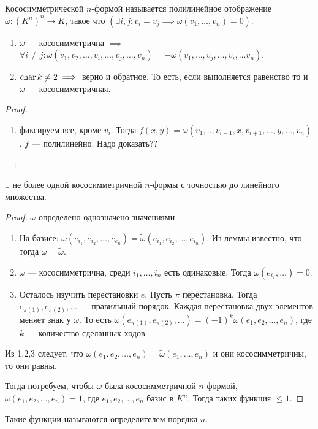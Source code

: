 \begin{definition}
    Кососимметрической $n$-формой называется полилинейное отображение  $\omega\!: (K^n)^n \to K$, такое что  $(\exists i, j\!: v_i = v_j \implies \omega(v_1, \ldots, v_n) = 0)$.
\end{definition}
\begin{statement}
    \begin{enumerate}
        \item $\omega$ --- кососимметрична  $\implies$  $\forall i \neq j\!: \omega(v_1, v_2, \ldots, v_i, \ldots, v_j, \ldots, v_n) = - \omega(v_1,\ldots, v_j, \ldots, v_i, \ldots v_n)$.
        \item $\operatorname{char} k \neq 2 \implies $ верно и обратное. То есть, если выполняется равенство то и  $\omega$ --- кососимметричная. 
    \end{enumerate}
\end{statement}
\begin{proof}
    \begin{enumerate}
        \item фиксируем все, кроме $v_i$. Тогда  $f(x, y) = \omega(v_1, .., v_{i-1}, x, v_{i+1}, \ldots, y, \ldots, v_n)$. $f$ --- полилинейно. Надо доказать?? 
    \end{enumerate}
\end{proof}
\begin{statement}
    $\exists$ не более одной кососимметричной  $n$-формы с точностью до линейного множества. 
\end{statement}
\begin{proof}
    $\omega$ определено однозначено значениями
     \begin{enumerate}
         \item На базисе: $\omega(e_{i_1}, e_{i_2}, \ldots, e_{e_n}) = \widetilde{\omega}(e_{i_1}, e_{i_2}, \ldots, e_{i_n})$. Из леммы известно, что тогда $\omega = \widetilde{\omega}$. 
         \item $\omega$ --- кососимметрична, среди  $i_1, \ldots, i_n$ есть одинаковые. Тогда $\omega(e_{i_1},\ldots) = 0$.
         \item Осталось изучить перестановки $e$. Пусть $\pi$ перестановка. Тогда  $e_{\pi(1)}, e_{\pi(2)}, \ldots$ --- правильный порядок. Каждая перестановка двух элементов меняет знак у $\omega$. То есть  $\omega(e_{\pi(1)}, e_{\pi(2)}, \ldots) = (-1)^k \omega(e_1, e_2, \ldots, e_n)$, где $k$ --- количество сделанных ходов.
    \end{enumerate}
    Из 1,2,3 следует, что  $\omega(e_1, e_2, \ldots, e_n) = \widetilde{\omega}(e_1, \ldots, e_n)$ и они кососимметричны, то они равны. 

    Тогда потребуем, чтобы $\omega$ была кососимметричной  $n$-формой,  $\omega(e_1, e_2,\ldots, e_n) = 1$, где $e_1, e_2, \ldots, e_n$ базис в $K^n$. Тогда таких функция  $\le 1$.
\end{proof}
\begin{definition}
    Такие функции называются определителем порядка $n$.
\end{definition}
